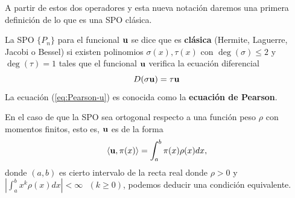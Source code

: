 A partir de estos dos operadores y esta nueva notación daremos una primera definición de lo que es una SPO clásica.


\begin{definicion}
    \label{def:SPO-clasica}
    La SPO $\{P_n  \}$ para el funcional $\mathbf{u}$ se dice que es \textbf{clásica} (Hermite, Laguerre, Jacobi o Bessel) si existen polinomios $\sigma(x), \tau(x)$ con $\deg(\sigma)\leq 2$ y $\deg(\tau)= 1$ tales que el funcional $\mathbf{u}$ verifica la ecuación diferencial
    \begin{equation}
        \label{eq:Pearson-u}
        D(\sigma \mathbf{u}) = \tau \mathbf{u}
    \end{equation}   
    La ecuación (\ref{eq:Pearson-u}) es conocida como la \textbf{ecuación de Pearson}.
\end{definicion}

En el caso de que la SPO sea ortogonal respecto a una función peso $\rho$ con momentos finitos, esto es, $\mathbf{u}$ es de la forma
\begin{equation}
    \label{eq:funcional-peso}
    \left\langle \mathbf{u} , \pi(x) \right\rangle = \int_a^b \pi(x)\rho(x)dx,
\end{equation}
donde $(a,b)$ es cierto intervalo de la recta real donde $\rho > 0$ y $\left|\int_a^b x^k \rho(x)dx\right| < \infty \ \ \ (k\geq 0)$, podemos deducir una condición equivalente.

